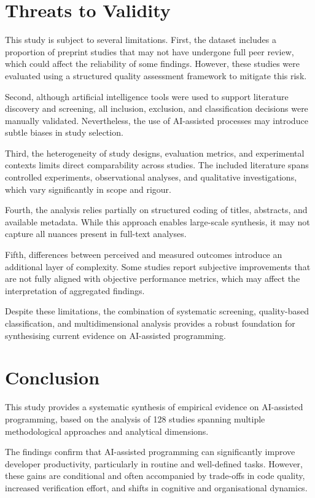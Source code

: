 \documentclass[conference]{IEEEtran}
\begin{document}
\section{Threats to Validity}

This study is subject to several limitations. First, the dataset includes a proportion of preprint studies that may not have undergone full peer review, which could affect the reliability of some findings. However, these studies were evaluated using a structured quality assessment framework to mitigate this risk.

Second, although artificial intelligence tools were used to support literature discovery and screening, all inclusion, exclusion, and classification decisions were manually validated. Nevertheless, the use of AI-assisted processes may introduce subtle biases in study selection.

Third, the heterogeneity of study designs, evaluation metrics, and experimental contexts limits direct comparability across studies. The included literature spans controlled experiments, observational analyses, and qualitative investigations, which vary significantly in scope and rigour.

Fourth, the analysis relies partially on structured coding of titles, abstracts, and available metadata. While this approach enables large-scale synthesis, it may not capture all nuances present in full-text analyses.

Fifth, differences between perceived and measured outcomes introduce an additional layer of complexity. Some studies report subjective improvements that are not fully aligned with objective performance metrics, which may affect the interpretation of aggregated findings.

Despite these limitations, the combination of systematic screening, quality-based classification, and multidimensional analysis provides a robust foundation for synthesising current evidence on AI-assisted programming.

\section{Conclusion}

This study provides a systematic synthesis of empirical evidence on AI-assisted programming, based on the analysis of 128 studies spanning multiple methodological approaches and analytical dimensions.

The findings confirm that AI-assisted programming can significantly improve developer productivity, particularly in routine and well-defined tasks. However, these gains are conditional and often accompanied by trade-offs in code quality, increased verification effort, and shifts in cognitive and organisational dynamics.
\end{document}
